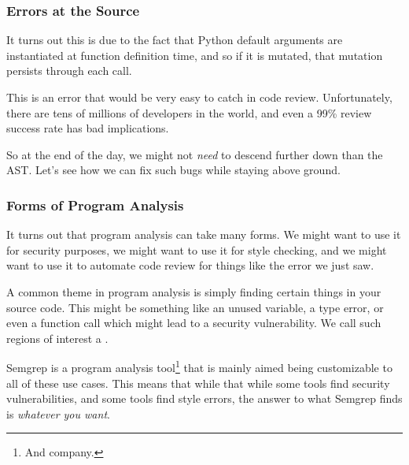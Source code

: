 \documentclass[aspectratio=169, handout]{beamer}
\begin{document}
\begin{frame}[fragile]
  \frametitle{Errors at the Source}

  It turns out this is due to the fact that Python default arguments are
  instantiated at function definition time, and so if it is mutated, that
  mutation persists through each call.

  \pause
  \vspace{\fill}

  This is an error that would be very easy to catch in code review. Unfortunately,
  there are tens of millions of developers in the world, and even a 99\%
  review success rate has bad implications.

  \pause
  \vspace{\fill}

  So at the end of the day, we might not \textit{need} to descend further down
  than the AST. Let's see how we can fix such bugs while staying above ground.
\end{frame}

\begin{frame}[fragile]
  \frametitle{Forms of Program Analysis}

  It turns out that program analysis can take many forms. We might want to use
  it for security purposes, we might want to use it for style checking, and we
  might want to use it to automate code review for things like the error we just
  saw.

  \pause
  \vspace{\fill}

  A common theme in program analysis is simply finding certain things in your
  source code. This might be something like an unused variable, a type error,
  or even a function call which might lead to a security vulnerability. We
  call such regions of interest a .

  \pause
  \vspace{\fill}

  Semgrep is a program analysis tool\footnote{And company.} that is mainly aimed
  being customizable to all of these use cases. This means that while that while
  some tools find security vulnerabilities, and some tools find style errors,
  the answer to what Semgrep finds is \textit{whatever you want}.
\end{frame}
\end{document}
